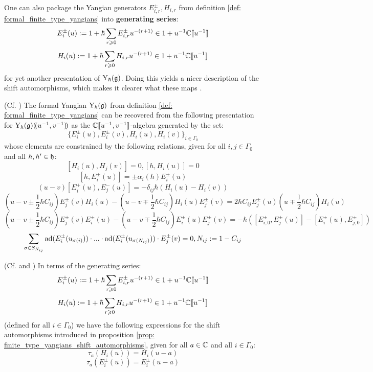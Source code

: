             One can also package the Yangian generators $E_{i, r}^{\pm}, H_{i, r}$ from definition \ref{def: formal_finite_type_yangians} into \textbf{generating  series}:
                $$E_i^{\pm}(u) := 1 + \hbar \sum_{r \geqslant 0} E_{i, r}^{\pm} u^{-(r + 1)} \in 1 + u^{-1} \mathbb{C}[\![u^{-1}]\!]$$
                $$H_i(u) := 1 + \hbar \sum_{r \geqslant 0} H_{i, r} u^{-(r + 1)} \in 1 + u^{-1} \mathbb{C}[\![u^{-1}]\!]$$
            for yet another presentation of $\mathrm{Y}_{\hbar}(\mathfrak{g})$. Doing this yields a nicer description of the shift automorphisms, which makes it clearer what these maps . 
            \begin{proposition}
                (Cf. \cite[Proposition 2.3]{gautam_and_toledano_laredo_yangians_quantum_loop_algebras_and_abelian_difference_equations}) The formal Yangian $\mathrm{Y}_{\hbar}(\mathfrak{g})$ from definition \ref{def: formal_finite_type_yangians} can be recovered from the following presentation for $\mathrm{Y}_{\hbar}(\mathfrak{g})(\!(u^{-1}, v^{-1})\!)$ as the $\mathbb{C}[\![u^{-1}, v^{-1}]\!]$-algebra generated by the set:
                    $$\{E_i^{\pm}(u), E_i^{\pm}(v), H_i(u), H_i(v)\}_{i \in \Gamma_0}$$
                whose elements are constrained by the following relations, given for all $i, j \in \Gamma_0$ and all $h, h' \in \mathfrak{h}$:
                    $$[H_i(u), H_j(v)] = 0, [h, H_i(u)] = 0$$
                    $$[h, E_i^{\pm}(u)] = \pm \alpha_i(h) E_i^{\pm}(u)$$
                    $$(u - v) [E_i^+(u), E_j^-(u)] = -\delta_{ij} \hbar ( H_i(u) - H_i(v) )$$
                    $$\left(u - v \pm \frac12 \hbar C_{ij}\right) E_j^{\pm}(v) H_i(u) - \left(u - v \mp  \frac12 \hbar C_{ij}\right) H_i(u) E_j^{\pm}(v) = 2 \hbar C_{ij} E_j^{\pm}(u) \left(u \mp \frac12 \hbar C_{ij}\right) H_i(u)$$
                    $$\left(u - v \pm \frac12 \hbar C_{ij}\right) E_j^{\pm}(v) E_i^{\pm}(u) - \left(u - v \mp \frac12 \hbar C_{ij}\right) E_i^{\pm}(u) E_j^{\pm}(v) = -\hbar( [E_{i, 0}^{\pm}, E_j^{\pm}(u)] - [E_i^{\pm}(u), E_{j, 0}^{\pm}] )$$
                    $$\sum_{\sigma \in S_{N_{ij}}} \mathrm{ad}( E_i^{\pm}( u_{\sigma(i)} ) ) \cdot ... \cdot \mathrm{ad}( E_i^{\pm}( u_{\sigma(N_{ij})} ) ) \cdot E_j^{\pm}(v) = 0, N_{ij} := 1 - C_{ij}$$
            \end{proposition}
            \begin{proposition} \label{prop: shift_automorphisms_via_generating_series}
                (Cf. \cite[Subsection 2.8]{gautam_and_toledano_laredo_yangians_quantum_loop_algebras_and_abelian_difference_equations} and \cite[Remark 2.4]{wendlandt_formal_shift_operators}) In terms of the generating series:
                    $$E_i^{\pm}(u) := 1 + \hbar \sum_{r \geqslant 0} E_{i, r}^{\pm} u^{-(r + 1)} \in 1 + u^{-1} \mathbb{C}[\![u^{-1}]\!]$$
                    $$H_i(u) := 1 + \hbar \sum_{r \geqslant 0} H_{i, r} u^{-(r + 1)} \in 1 + u^{-1} \mathbb{C}[\![u^{-1}]\!]$$
                (defined for all $i \in \Gamma_0$) we have the following expressions for the shift automorphisms introduced in proposition \ref{prop: finite_type_yangians_shift_automorphisms}, given for all $a \in \mathbb{C}$ and all $i \in \Gamma_0$:
                    $$\tau_a(H_i(u)) = H_i(u - a)$$
                    $$\tau_a(E_i^{\pm}(u)) = E_i^{\pm}(u - a)$$
            \end{proposition}
